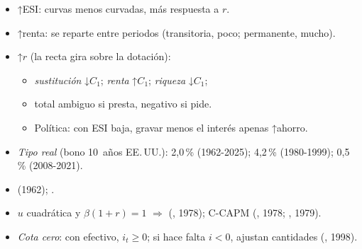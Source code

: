 \documentclass{article}
\begin{document}
\begin{columnas}
\begin{itemize}
\end{itemize}
\begin{itemize}
\item ↑ESI: curvas menos curvadas, más respuesta a $r$.
\item ↑renta: se reparte entre periodos (transitoria, poco; permanente, mucho).
\item ↑$r$ (la recta gira sobre la dotación):
  \begin{itemize}
  \item \emph{sustitución} ↓$C_1$; \emph{renta} ↑$C_1$; \emph{riqueza} ↓$C_1$;
  \item total ambiguo si presta, negativo si pide.
  \item Política: con ESI baja, gravar menos el interés apenas ↑ahorro.
  \end{itemize}
\end{itemize}
\begin{itemize}
\item \emph{Tipo real} (bono 10~años EE.\,UU.): 2,0\,\% (1962-2025); 4,2\,\% (1980-1999); 0,5\,\% (2008-2021).
\end{itemize}
\begin{itemize}
\item {} (1962);  .
\item $u$ cuadrática y $\beta(1+r)=1$ $\Rightarrow$  (, 1978); C-CAPM (, 1978; , 1979).
\item \emph{Cota cero}: con efectivo, $i_t\geq0$; si hace falta $i<0$, ajustan cantidades (, 1998).
\end{itemize}


\end{columnas}
\end{document}
